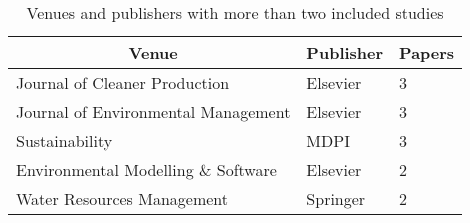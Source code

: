 \begin{table}[]
\centering
\caption{Venues and publishers with more than two included studies}
\label{tab:venues-publishers}
\begin{tabular}{@{}lll@{}}
\toprule
\multicolumn{1}{c}{\textbf{Venue}} & \multicolumn{1}{c}{\textbf{Publisher}} & \multicolumn{1}{c}{\textbf{Papers}} \\ \midrule
Journal of Cleaner Production & Elsevier & 3 \\
Journal of Environmental Management & Elsevier & 3 \\
Sustainability & MDPI & 3 \\
Environmental Modelling \& Software & Elsevier & 2 \\
Water Resources Management & Springer & 2 \\

\bottomrule
\end{tabular}
\end{table}